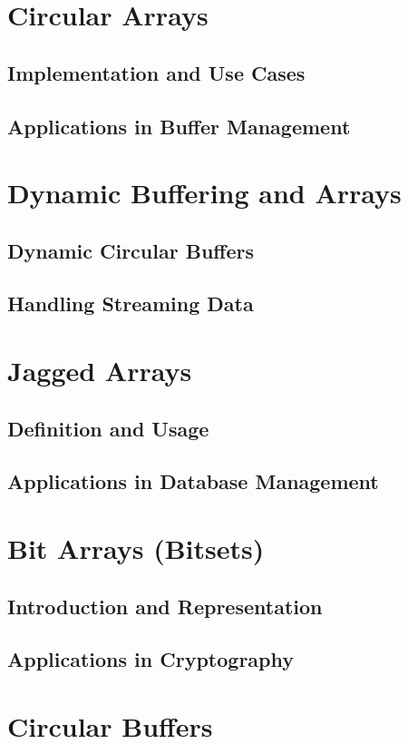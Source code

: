 \documentclass[12pt, oneside]{book}
\begin{document}
	\section{Circular Arrays}
	\subsection{Implementation and Use Cases}
	\subsection{Applications in Buffer Management}
	
	\section{Dynamic Buffering and Arrays}
	\subsection{Dynamic Circular Buffers}
	\subsection{Handling Streaming Data}
	
	\section{Jagged Arrays}
	\subsection{Definition and Usage}
	\subsection{Applications in Database Management}
	
	\section{Bit Arrays (Bitsets)}
	\subsection{Introduction and Representation}
	\subsection{Applications in Cryptography}
	\section{Circular Buffers}
\end{document}
